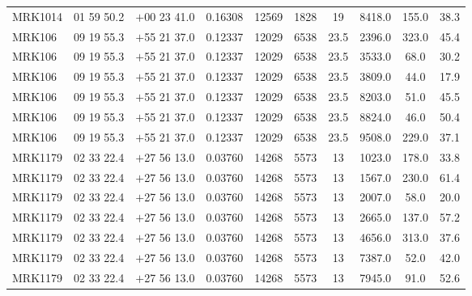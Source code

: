 \begin{landscape}
\begin{center}
\begin{longtable}{l c c c c c c c c c}
MRK1014  &                 01 59 50.2  &         $+$00 23 41.0  &       0.16308  & 12569  &   1828  &       19  &        8418.0  &  155.0  &  38.3  \\
MRK106  &                  09 19 55.3  &         $+$55 21 37.0  &       0.12337  & 12029  &   6538  &       23.5  &      2396.0  &  323.0  &  45.4  \\
MRK106  &                  09 19 55.3  &         $+$55 21 37.0  &       0.12337  & 12029  &   6538  &       23.5  &      3533.0  &  68.0  &   30.2  \\
MRK106  &                  09 19 55.3  &         $+$55 21 37.0  &       0.12337  & 12029  &   6538  &       23.5  &      3809.0  &  44.0  &   17.9  \\
MRK106  &                  09 19 55.3  &         $+$55 21 37.0  &       0.12337  & 12029  &   6538  &       23.5  &      8203.0  &  51.0  &   45.5  \\
MRK106  &                  09 19 55.3  &         $+$55 21 37.0  &       0.12337  & 12029  &   6538  &       23.5  &      8824.0  &  46.0  &   50.4  \\
MRK106  &                  09 19 55.3  &         $+$55 21 37.0  &       0.12337  & 12029  &   6538  &       23.5  &      9508.0  &  229.0  &  37.1  \\
MRK1179  &                 02 33 22.4  &         $+$27 56 13.0  &       0.03760  & 14268  &   5573  &       13  &        1023.0  &  178.0  &  33.8  \\
MRK1179  &                 02 33 22.4  &         $+$27 56 13.0  &       0.03760  & 14268  &   5573  &       13  &        1567.0  &  230.0  &  61.4  \\
MRK1179  &                 02 33 22.4  &         $+$27 56 13.0  &       0.03760  & 14268  &   5573  &       13  &        2007.0  &  58.0  &   20.0  \\
MRK1179  &                 02 33 22.4  &         $+$27 56 13.0  &       0.03760  & 14268  &   5573  &       13  &        2665.0  &  137.0  &  57.2  \\
MRK1179  &                 02 33 22.4  &         $+$27 56 13.0  &       0.03760  & 14268  &   5573  &       13  &        4656.0  &  313.0  &  37.6  \\
MRK1179  &                 02 33 22.4  &         $+$27 56 13.0  &       0.03760  & 14268  &   5573  &       13  &        7387.0  &  52.0  &   42.0  \\
MRK1179  &                 02 33 22.4  &         $+$27 56 13.0  &       0.03760  & 14268  &   5573  &       13  &        7945.0  &  91.0  &   52.6  \\

\end{longtable}
\end{center}
\end{landscape}
